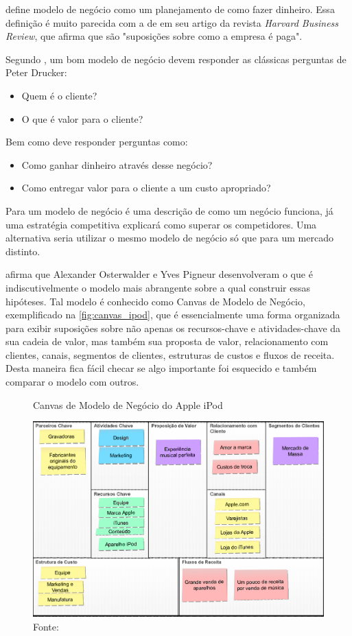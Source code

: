  define modelo de negócio como um planejamento de como fazer dinheiro. Essa definição é muito parecida com a de  em seu artigo da revista \textit{Harvard Business Review}, que afirma que são "suposições sobre como a empresa é paga".

Segundo , um bom modelo de negócio devem responder as clássicas perguntas de Peter Drucker:
\begin{itemize}
\item Quem é o cliente?
\item O que é valor para o cliente?
\end{itemize}
Bem como deve responder perguntas como:
\begin{itemize}
\item Como ganhar dinheiro através desse negócio?
\item Como entregar valor para o cliente a um custo apropriado?
\end{itemize}

Para  um modelo de negócio é uma descrição de como um negócio funciona, já uma estratégia competitiva explicará como superar os competidores. Uma alternativa seria utilizar o mesmo modelo de negócio só que para um mercado distinto.

 afirma que Alexander Osterwalder e Yves Pigneur desenvolveram o que é indiscutivelmente o modelo mais abrangente sobre a qual construir essas hipóteses. Tal modelo é conhecido como Canvas de Modelo de Negócio, exemplificado na \autoref{fig:canvas_ipod}, que é essencialmente uma forma organizada para exibir suposições sobre não apenas os recursos-chave e atividades-chave da sua cadeia de valor, mas também sua proposta de valor, relacionamento com clientes, canais, segmentos de clientes, estruturas de custos e fluxos de receita. Desta maneira fica fácil checar se algo importante foi esquecido e também  comparar o modelo com outros.

\begin{figure}[H]
\caption{Canvas de Modelo de Negócio do Apple iPod}
\centerline{\includegraphics[scale=0.25]{img/canvas_ipod}}
\label{fig:canvas_ipod}
\caption* {Fonte: }
\end{figure}

